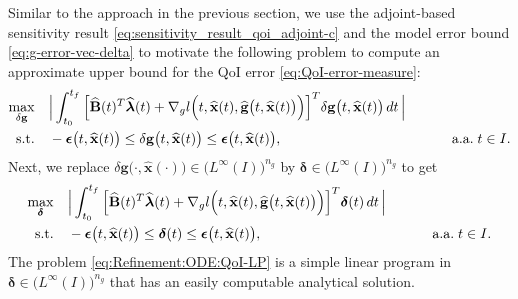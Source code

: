 \documentclass[onefignum,onetabnum]{siamart220329}
\numberwithin{equation}{section}
\newcommand{\aall}{\mbox{ a.a.} \;}
\newcommand{\bg}{\ensuremath{\mathbf{g}}} %
\newcommand{\bx}{\ensuremath{\mathbf{x}}} %
\newcommand {\bdelta} {\boldsymbol{\delta}}
\newcommand {\bepsilon} {\mbox{\boldmath $\epsilon$}}
\newcommand {\blambda} {\mbox{\boldmath $\lambda$}}
\newcommand{\BB}{\ensuremath{\mathbf{B}} } %
\begin{document}
Similar to the approach in the previous section, we use the adjoint-based sensitivity result \eqref{eq:sensitivity_result_qoi_adjoint-c} and the model error bound \eqref{eq:g-error-vec-delta} to motivate the following problem to compute an approximate upper bound for the QoI error \eqref{eq:QoI-error-measure}:
\begin{subequations}    \label{eq:Refinement:ODE:QoI-LP0}
\begin{align}
	\max_{\delta \bg} \quad & \Big|   \int_{t_0}^{t_f}  \Big[  \widehat{\BB}(t)^T \widehat{\blambda}(t) + \nabla_g l \Big( t, \widehat{\bx}(t), \widehat{\bg} \big( t, \widehat{\bx}(t) \big) \Big)  \Big]^T \delta \bg\big( t, \widehat{\bx}(t) \big) \, dt \, \Big|   \\
	\mbox{s.t.} \quad &  - \bepsilon\big( t, \widehat{\bx}(t) \big) \leq \delta \bg \big(t, \widehat{\bx}(t) \big) \leq \bepsilon\big( t, \widehat{\bx}(t) \big), & \qquad \aall t \in I.
\end{align}
\end{subequations}
Next, we replace $\delta \bg\big( \cdot, \widehat{\bx}(\cdot) \big) \in \big(L^\infty(I) \big)^{n_g}$ by $\bdelta \in \big(L^\infty(I) \big)^{n_g}$ to get
\begin{subequations} \label{eq:Refinement:ODE:QoI-LP}
\begin{align}
	\max_{\bdelta } \quad & \Big| \int_{t_0}^{t_f}  \Big[  \widehat{\BB}(t)^T \widehat{\blambda}(t) + \nabla_g l \Big( t, \widehat{\bx}(t), \widehat{\bg} \big( t, \widehat{\bx}(t) \big) \Big)  \Big]^T \bdelta(t) \, dt \, \Big| \label{eq:ODE_sensitivity_qoi:objective}  \\
	\mbox{s.t.} \quad &  - \bepsilon\big( t, \widehat{\bx}(t) \big) \leq \bdelta(t) \leq \bepsilon\big( t, \widehat{\bx}(t) \big), & \qquad \aall t \in I. \label{eq:ODE_sensitivity_qoi:box-constraints}
\end{align}
\end{subequations}
The problem \eqref{eq:Refinement:ODE:QoI-LP} is a simple linear program in $\bdelta \in \big(L^\infty(I) \big)^{n_g}$ that has an easily computable analytical solution.
\end{document}
